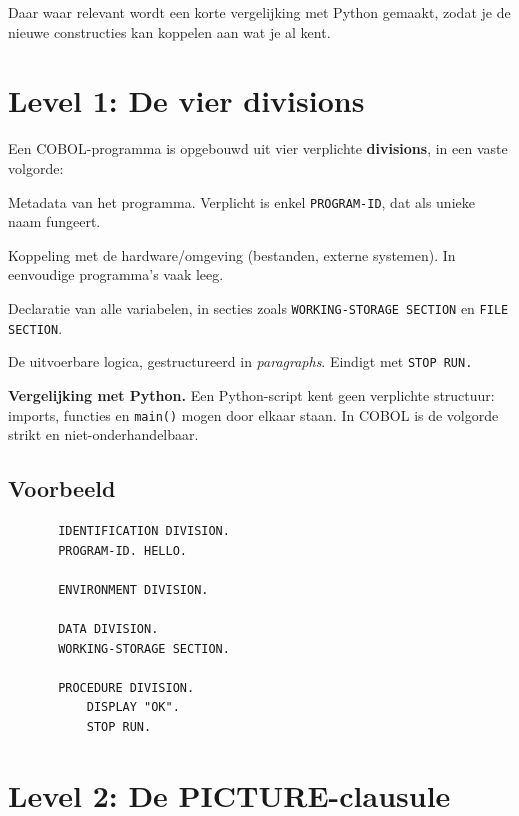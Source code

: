 \documentclass[11pt,a4paper]{article}
\begin{document}
Daar waar relevant wordt een korte vergelijking met Python gemaakt, zodat je de nieuwe constructies kan koppelen aan wat je al kent.

\section{Level 1: De vier divisions}

Een COBOL-programma is opgebouwd uit vier verplichte \textbf{divisions}, in een vaste volgorde:

\begin{description}[leftmargin=4cm,labelwidth=3.5cm,style=nextline]
    \item[\texttt{IDENTIFICATION DIVISION}] Metadata van het programma. Verplicht is enkel \texttt{PROGRAM-ID}, dat als unieke naam fungeert.
    \item[\texttt{ENVIRONMENT DIVISION}] Koppeling met de hardware/omgeving (bestanden, externe systemen). In eenvoudige programma's vaak leeg.
    \item[\texttt{DATA DIVISION}] Declaratie van alle variabelen, in secties zoals \texttt{WORKING-STORAGE SECTION} en \texttt{FILE SECTION}.
    \item[\texttt{PROCEDURE DIVISION}] De uitvoerbare logica, gestructureerd in \textit{paragraphs}. Eindigt met \texttt{STOP RUN.}
\end{description}

\textbf{Vergelijking met Python.} Een Python-script kent geen verplichte structuur: imports, functies en \texttt{main()} mogen door elkaar staan. In COBOL is de volgorde strikt en niet-onderhandelbaar.

\subsection*{Voorbeeld}
\begin{lstlisting}
       IDENTIFICATION DIVISION.
       PROGRAM-ID. HELLO.

       ENVIRONMENT DIVISION.

       DATA DIVISION.
       WORKING-STORAGE SECTION.

       PROCEDURE DIVISION.
           DISPLAY "OK".
           STOP RUN.
\end{lstlisting}

\section{Level 2: De PICTURE-clausule}
\end{document}
